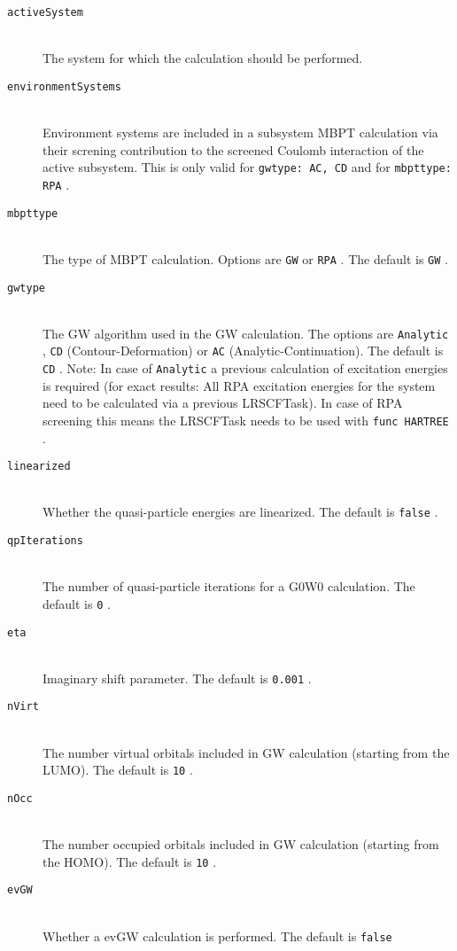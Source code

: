 \documentclass[bibliography=totocnumbered,a4paper,10pt,oneside]{scrbook}
\newcommand{\ttt}[1]{%
  \begingroup\setlength{\fboxsep}{1pt}%
  \colorbox{serenity-green!30}{\texttt{\hspace*{2pt}\vphantom{(g}#1\hspace*{2pt}}}%
  \endgroup
}
\begin{document}
\begin{description}
  \item [\texttt{activeSystem}]\hfill \\
  The system for which the calculation should be performed.
  \item [\texttt{environmentSystems}]\hfill \\
  Environment systems are included in a subsystem MBPT calculation via their screning contribution to the screened Coulomb interaction of the active subsystem. This is only valid for \ttt{gwtype: AC, CD} and for \ttt{mbpttype: RPA}.  
  \item [\texttt{mbpttype}]\hfill \\
  The type of MBPT calculation. Options are \ttt{GW} or \ttt{RPA}. The default is \ttt{GW}.
  \item [\texttt{gwtype}]\hfill \\
  The GW algorithm used in the GW calculation. The options are \ttt{Analytic}, \ttt{CD} (Contour-Deformation) or \ttt{AC} (Analytic-Continuation). The default is \ttt{CD}. Note: In case of \ttt{Analytic} a previous calculation of excitation energies is required (for exact results: All RPA excitation energies for the system need to be calculated via a previous LRSCFTask). In case of RPA screening this means the LRSCFTask needs to be used with \ttt{func HARTREE}.
  \item [\texttt{linearized}]\hfill \\
  Whether the quasi-particle energies are linearized. The default is \ttt{false}.
  \item [\texttt{qpIterations}]\hfill \\
  The number of quasi-particle iterations for a G0W0 calculation. The default is \ttt{0}.
  \item [\texttt{eta}]\hfill \\
  Imaginary shift parameter. The default is \ttt{0.001}.
  \item [\texttt{nVirt}]\hfill \\
  The number virtual orbitals included in GW calculation (starting from the LUMO). The default is \ttt{10}.
  \item [\texttt{nOcc}]\hfill \\
  The number occupied orbitals included in GW calculation (starting from the HOMO). The default is \ttt{10}.
  \item [\texttt{evGW}]\hfill \\
  Whether a evGW calculation is performed. The default is \ttt{false}

\end{description}
\end{document}
